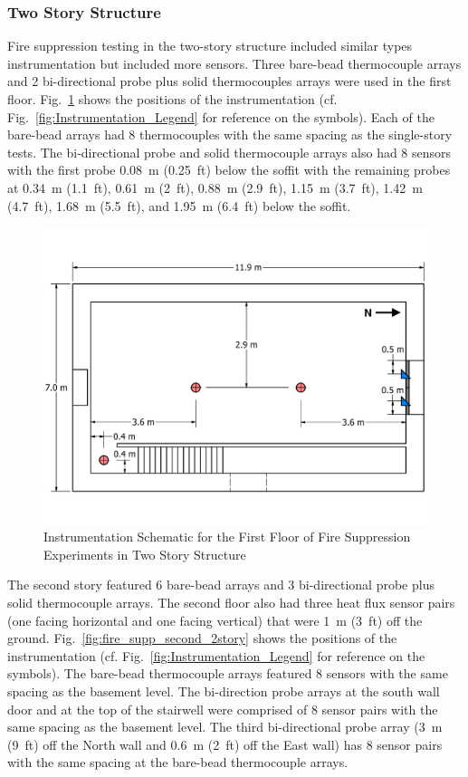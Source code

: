 \documentclass[12pt,oneside]{book}
\begin{document}
\subsubsection*{Two Story Structure}

Fire suppression testing in the two-story structure included similar types instrumentation but included more sensors. Three bare-bead thermocouple arrays and 2 bi-directional probe plus solid thermocouples arrays were used in the first floor. Fig.~\ref{fig:fire_supp_first_2story} shows the positions of the instrumentation (cf. Fig.~\ref{fig:Instrumentation_Legend} for reference on the symbols). Each of the bare-bead arrays had 8 thermocouples with the same spacing as the single-story tests. The bi-directional probe and solid thermocouple arrays also had 8 sensors with the first probe 0.08~m (0.25~ft) below the soffit with the remaining probes at 0.34~m (1.1~ft), 0.61~m (2~ft), 0.88~m (2.9~ft), 1.15~m (3.7~ft), 1.42~m (4.7~ft), 1.68~m (5.5~ft), and 1.95~m (6.4~ft) below the soffit.

\begin{figure}[!ht]
	\includegraphics[width=\columnwidth]{../../DelCo_2014_2015/Drawings/PDFs/CAFS/West_Structure_1st_Floor_Instrumentation}
	\caption{Instrumentation Schematic for the First Floor of Fire Suppression Experiments in Two Story Structure}
	\label{fig:fire_supp_first_2story}
\end{figure}

The second story featured 6 bare-bead arrays and 3 bi-directional probe plus solid thermocouple arrays. The second floor also had three heat flux sensor pairs (one facing horizontal and one facing vertical) that were 1~m (3~ft) off the ground. Fig.~\ref{fig:fire_supp_second_2story} shows the positions of the instrumentation (cf. Fig.~\ref{fig:Instrumentation_Legend} for reference on the symbols). The bare-bead thermocouple arrays featured 8 sensors with the same spacing as the basement level. The bi-direction probe arrays at the south wall door and at the top of the stairwell were comprised of 8 sensor pairs with the same spacing as the basement level. The third bi-directional probe array (3~m (9~ft) off the North wall and 0.6~m (2~ft) off the East wall) has 8 sensor pairs with the same spacing at the bare-bead thermocouple arrays.
\end{document}
